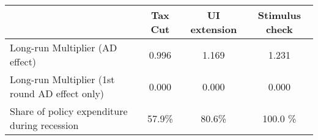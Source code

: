 \begin{tabular}{@{}lccc@{}} 
\toprule 
& Tax Cut    & UI extension    & Stimulus check    \\  \midrule 
Long-run Multiplier (AD effect) &0.996  & 1.169  & 1.231     \\ 
Long-run Multiplier (1st round AD effect only) &0.000  & 0.000  & 0.000     \\ 
Share of policy expenditure during recession &57.9\%  & 80.6\%  & 100.0 \%    \\ 
\end{tabular}  
